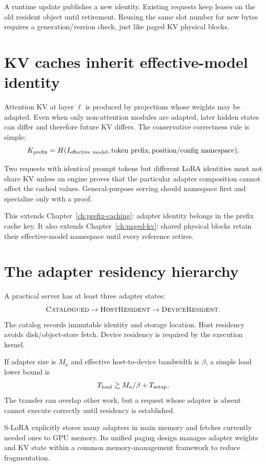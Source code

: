 A runtime update publishes a new identity. Existing requests keep leases on the old
resident object until retirement. Reusing the same slot number for new bytes requires
a generation/version check, just like paged KV physical blocks.

\section{KV caches inherit effective-model identity}

Attention KV at layer $\ell$ is produced by projections whose weights may be adapted.
Even when only non-attention modules are adapted, later hidden states can differ and
therefore future KV differs. The conservative correctness rule is simple:
\[
K_{\rm prefix}=
H(I_{\rm effective\ model},\text{token prefix},\text{position/config namespace}).
\]

Two requests with identical prompt tokens but different LoRA identities must not share
KV unless an engine proves that the particular adapter composition cannot affect the
cached values. General-purpose serving should namespace first and specialize only with
a proof.

This extends Chapter~\ref{ch:prefix-caching}: adapter identity belongs in the prefix
cache key. It also extends Chapter~\ref{ch:paged-kv}: shared physical blocks retain
their effective-model namespace until every reference retires.

\section{The adapter residency hierarchy}

A practical server has at least three adapter states:
\[
\textsc{Catalogued}\rightarrow\textsc{HostResident}\rightarrow\textsc{DeviceResident}.
\]
The catalog records immutable identity and storage location. Host residency avoids
disk/object-store fetch. Device residency is required by the execution kernel.

If adapter size is $M_a$ and effective host-to-device bandwidth is $\beta$, a simple
load lower bound is
\[
T_{\rm load}\gtrsim M_a/\beta+T_{\rm setup}.
\]
The transfer can overlap other work, but a request whose adapter is absent cannot
execute correctly until residency is established.

S-LoRA explicitly stores many adapters in main memory and fetches currently needed
ones to GPU memory. Its unified paging design manages adapter weights and KV state
within a common memory-management framework to reduce fragmentation. \cite{sheng2024slora}

